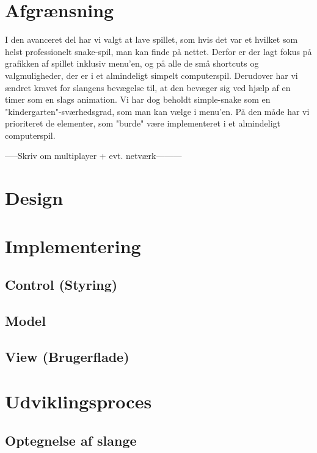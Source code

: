 \documentclass{report}
\begin{document}
\section{Afgrænsning}
I den avanceret del har vi valgt at lave spillet, som hvis det var et hvilket som helst professionelt snake-spil, man kan finde på nettet. Derfor er der lagt fokus på grafikken af spillet inklusiv menu'en, og på alle de små shortcuts og valgmuligheder, der er i et almindeligt simpelt computerspil. Derudover har vi ændret kravet for slangens bevægelse til, at den bevæger sig ved hjælp af en timer som en slags animation. Vi har dog beholdt simple-snake som en "kindergarten"-sværhedsgrad, som man kan vælge i menu'en.
På den måde har vi prioriteret de elementer, som "burde" være implementeret i et almindeligt computerspil. 

-----Skriv om multiplayer + evt. netværk---------
\section{Design}

\section{Implementering}

\subsection{Control (Styring)}

\subsection{Model}

\subsection{View (Brugerflade)}


\section{Udviklingsproces}

\subsection{Optegnelse af slange}
\end{document}
